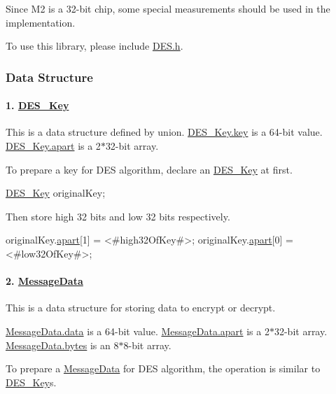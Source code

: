 Since M2 is a 32-\/bit chip, some special measurements should be used in the implementation.

To use this library, please include {\ttfamily \mbox{\hyperlink{a00026}{D\+E\+S.\+h}}}.

\subsubsection*{Data Structure}

\paragraph*{1. \mbox{\hyperlink{a00190}{D\+E\+S\+\_\+\+Key}}}

This is a data structure defined by union. \mbox{\hyperlink{a00190_a48b5dadf7decf3076826072563041f1b}{D\+E\+S\+\_\+\+Key.\+key}} is a 64-\/bit value. \mbox{\hyperlink{a00190_a3e14395e8ac22e9e775a243041daaeeb}{D\+E\+S\+\_\+\+Key.\+apart}} is a 2$\ast$32-\/bit array.

To prepare a key for D\+ES algorithm, declare an \mbox{\hyperlink{a00190}{D\+E\+S\+\_\+\+Key}} at first.


\begin{DoxyCode}
\mbox{\hyperlink{a00190}{DES\_Key}} originalKey;
\end{DoxyCode}


Then store high 32 bits and low 32 bits respectively.


\begin{DoxyCode}
originalKey.\mbox{\hyperlink{a00190_a3e14395e8ac22e9e775a243041daaeeb}{apart}}[1] = <#high32OfKey#>;
originalKey.\mbox{\hyperlink{a00190_a3e14395e8ac22e9e775a243041daaeeb}{apart}}[0] = <#low32OfKey#>;
\end{DoxyCode}


\paragraph*{2. \mbox{\hyperlink{a00194}{Message\+Data}}}

This is a data structure for storing data to encrypt or decrypt.

\mbox{\hyperlink{a00194_a2cf9dd28d0679205048930fe98fa116b}{Message\+Data.\+data}} is a 64-\/bit value. \mbox{\hyperlink{a00194_a43406dd2e72f1230b8f70551a96699c5}{Message\+Data.\+apart}} is a 2$\ast$32-\/bit array. \mbox{\hyperlink{a00194_aaceaebf6f0349dae52e2c1c2a462b654}{Message\+Data.\+bytes}} is an 8$\ast$8-\/bit array.

To prepare a \mbox{\hyperlink{a00194}{Message\+Data}} for D\+ES algorithm, the operation is similar to \mbox{\hyperlink{a00190}{D\+E\+S\+\_\+\+Key}}\textquotesingle{}s.

